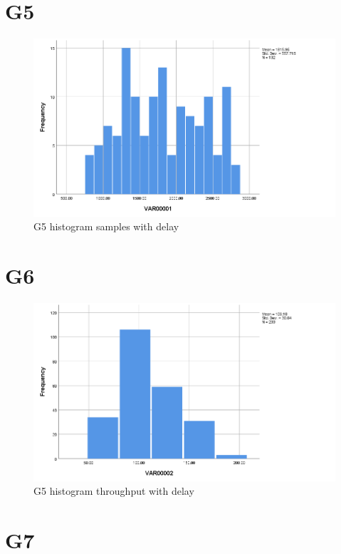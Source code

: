 \documentclass[hidelinks, 12pt, a4paper]{article}
\begin{document}
\section{G5}

\begin{figure}[h!]
	\centering
		\includegraphics[height=.4\textheight, width=\textwidth]{assets/session1/g5.png}
		\caption{G5 histogram samples with delay} 
	\end{figure}

\section{G6}

\begin{figure}[h!]
	\centering
		\includegraphics[height=.4\textheight, width=\textwidth]{assets/session1/g6.png}
		\caption{G5 histogram throughput with delay} 
	\end{figure}

\section{G7}
\end{document}
